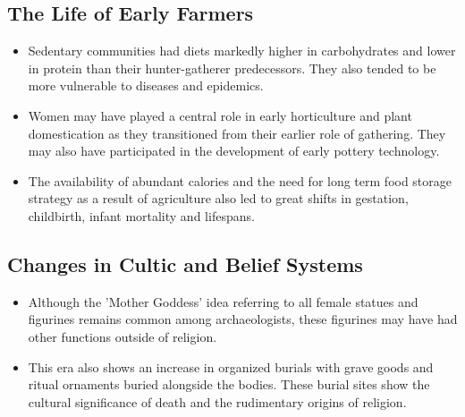 \subsection{The Life of Early Farmers}
\begin{itemize}
    \item Sedentary communities had diets markedly higher in carbohydrates and lower in protein than their hunter-gatherer predecessors. They also tended to be more vulnerable to diseases and epidemics.
    \item Women may have played a central role in early horticulture and plant domestication as they transitioned from their earlier role of gathering. They may also have participated in the development of early pottery technology.
    \item The availability of abundant calories and the need for long term food storage strategy as a result of agriculture also led to great shifts in gestation, childbirth, infant mortality and lifespans.
\end{itemize}

\subsection{Changes in Cultic and Belief Systems}
\begin{itemize}
    \item Although the 'Mother Goddess' idea referring to all female statues and figurines remains common among archaeologists, these figurines may have had other functions outside of religion.
    \item This era also shows an increase in organized burials with grave goods and ritual ornaments buried alongside the bodies. These burial sites show the cultural significance of death and the rudimentary origins of religion.
\end{itemize}

